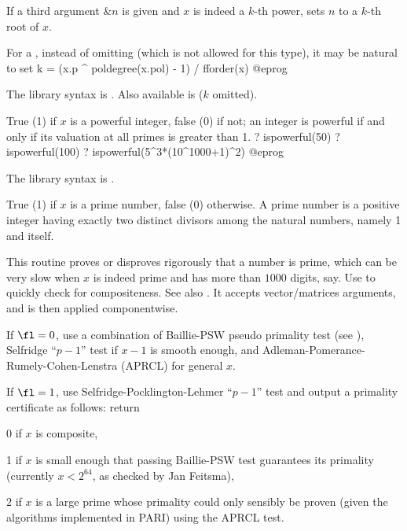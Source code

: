 If a third argument $\&n$ is given and $x$ is indeed a $k$-th power, sets
$n$ to a $k$-th root of $x$.

\noindent For a  , instead of omitting  (which is
not allowed for this type), it may be natural to set
\bprog
k = (x.p ^ poldegree(x.pol) - 1) / fforder(x)
@eprog

The library syntax is .
Also available is
 ($k$ omitted).

\label{se:ispowerful}
True (1) if $x$ is a powerful integer, false (0) if not;
an integer is powerful if and only if its valuation at all primes is
greater than 1.
\bprog
? ispowerful(50)
? ispowerful(100)
? ispowerful(5^3*(10^1000+1)^2)
@eprog

The library syntax is .

\label{se:isprime}
True (1) if $x$ is a prime
number, false (0) otherwise. A prime number is a positive integer having
exactly two distinct divisors among the natural numbers, namely 1 and
itself.

This routine proves or disproves rigorously that a number is prime, which can
be very slow when $x$ is indeed prime and has more than $1000$ digits, say.
Use  to quickly check for compositeness. See also
. It accepts vector/matrices arguments, and is then applied
componentwise.

If $\fl=0$, use a combination of Baillie-PSW pseudo primality test (see
), Selfridge ``$p-1$'' test if $x-1$ is smooth enough, and
Adleman-Pomerance-Rumely-Cohen-Lenstra (APRCL) for general $x$.

If $\fl=1$, use Selfridge-Pocklington-Lehmer ``$p-1$'' test and output a
primality certificate as follows: return

\item 0 if $x$ is composite,

\item 1 if $x$ is small enough that passing Baillie-PSW test guarantees
its primality (currently $x < 2^{64}$, as checked by Jan Feitsma),

\item $2$ if $x$ is a large prime whose primality could only sensibly be
proven (given the algorithms implemented in PARI) using the APRCL test.

